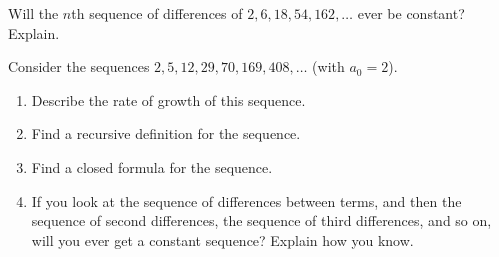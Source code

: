 \documentclass[11pt,]{book}
\theoremstyle{ptxplainnotitle}
\theoremstyle{ptxplaintitle}
\theoremstyle{ptxdefinitionnotitle}
\theoremstyle{ptxdefinitiontitle}
\theoremstyle{ptxdefinitionnotitle}
\theoremstyle{ptxdefinitiontitle}
\theoremstyle{ptxdefinitionnotitle}
\theoremstyle{ptxdefinitiontitle}
\theoremstyle{ptxdefinitiontitlenonumber}
\theoremstyle{ptxdefinitiontitlenonumber}
\numberwithin{equation}{chapter}
\begin{document}
\begin{divisionexercise}{12}\hypertarget{exercise-40}{}
\hypertarget{p-428}{}%
Will the \(n\)th sequence of differences of \(2, 6, 18, 54, 162, \ldots\) ever be constant? Explain.%
\end{divisionexercise}%
\begin{divisionexercise}{13}\hypertarget{exercise-41}{}
\hypertarget{p-429}{}%
Consider the sequences \(2, 5, 12, 29, 70, 169, 408,\ldots\) (with \(a_0 = 2\)).%
\par
\hypertarget{p-430}{}%
\leavevmode%
\begin{enumerate}[label=(\alph*)]
\item\hypertarget{li-224}{}\hypertarget{p-431}{}%
Describe the rate of growth of this sequence. %
\item\hypertarget{li-225}{}\hypertarget{p-432}{}%
Find a recursive definition for the sequence. %
\item\hypertarget{li-226}{}\hypertarget{p-433}{}%
Find a closed formula for the sequence. %
\item\hypertarget{li-227}{}\hypertarget{p-434}{}%
If you look at the sequence of differences between terms, and then the sequence of second differences, the sequence of third differences, and so on, will you ever get a constant sequence? Explain how you know. %
\end{enumerate}
%
\end{divisionexercise}%
\typeout{************************************************}
\typeout{************************************************}
\end{document}

